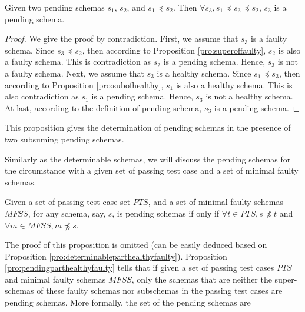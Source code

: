 %
\begin{proposition}\label{pro:pendingsandwich}
Given two pending schemas $s_{1}$, $s_{2}$, and $s_{1} \preceq s_{2}$. Then $\forall s_{3}, s_{1} \preceq s_{3} \preceq s_{2}$, $s_{3}$ is a pending schema.
\end{proposition}

\begin{proof}
We give the proof by contradiction. First, we assume that $s_{3}$ is a faulty schema. Since $s_{3} \preceq s_{2}$, then according to Proposition \ref{pro:superoffaulty}, $s_{2}$ is also a faulty schema. This is contradiction as $s_{2}$ is a pending schema. Hence, $s_{3}$ is not a faulty schema. Next, we assume that $s_{3}$ is a healthy schema.  Since $s_{1} \preceq s_{3}$, then according to Proposition \ref{pro:subofhealthy}, $s_{1}$ is also a healthy schema. This is also contradiction as $s_{1}$ is a pending schema.  Hence, $s_{3}$ is not a healthy schema. At last, according to the definition of pending schema, $s_{3}$ is a pending schema.
\end{proof}

This proposition gives the determination of pending schemas in the presence of two subsuming pending schemas.

Similarly as the determinable schemas, we will discuss the pending schemas for the circumstance with a given set of passing test case and a set of minimal faulty schemas.


\begin{proposition}\label{pro:pendingparthealthyfaulty}
Given a set of passing test case set $PTS$, and a set of minimal faulty schemas $MFSS$, for any schema, say, $s$, is pending schemas if only if $\forall t \in PTS, s \npreceq t$ and $\forall m \in MFSS, m \npreceq s$.
\end{proposition}

The proof of this proposition is omitted (can be easily deduced based on Proposition \ref{pro:determinableparthealthyfaulty}). Proposition \ref{pro:pendingparthealthyfaulty} tells that if given a set of passing test cases $PTS$ and minimal faulty schemas $MFSS$, only the schemas that are neither the super-schemas of these faulty schemas nor subschemas in the passing test cases are pending schemas.  More formally, the set of the pending schemas are

